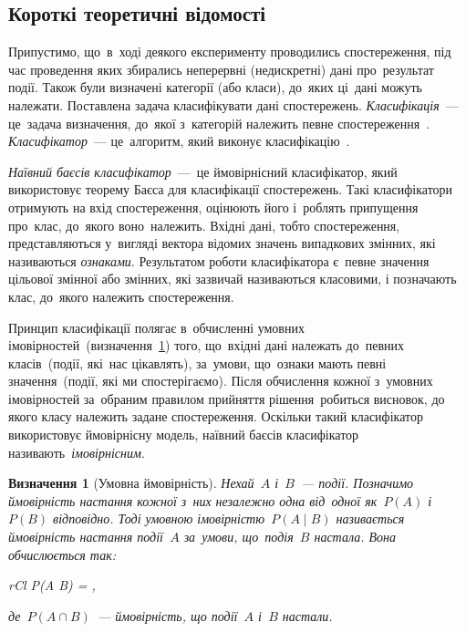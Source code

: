 \documentclass[
	a4paper,
	oneside,
	DIV = 12,
	fontsize = 13pt,
	headings = normal,
	numbers = endperiod,
]{scrartcl}
\theoremstyle{mythm}
\newtheorem{mydef}{Визначення}
\begin{document}
		\subsection{Короткі теоретичні відомості}
			\label{ssec:theory-short}
			Припустимо, що~в~ході деякого експерименту проводились спостереження, під час проведення яких збирались неперервні (недискретні) дані про~результат події. Також були визначені категорії (або класи), до~яких ці~дані можуть належати. Поставлена задача класифікувати дані спостережень. \emph{Класифікація}~— це~задача визначення, до~якої з~категорій належить певне спостереження~\cite{wiki-stat-classification}. \emph{Класифікатор}~— це~алгоритм, який виконує класифікацію~\cite{wiki-stat-classification}.

			\emph{Наївний баєсів класифікатор}~— це ймовірнісний класифікатор, який використовує теорему Баєса для класифікації спостережень. Такі класифікатори отримують на вхід спостереження, оцінюють його і~роблять припущення про~клас, до~якого воно~належить. Вхідні дані, тобто спостереження, представляються у~вигляді вектора відомих значень випадкових змінних, які називаються \emph{ознаками}. Результатом роботи класифікатора є~певне значення цільової змінної або змінних, які зазвичай називаються класовими, і позначають клас, до~якого належить спостереження.

			Принцип класифікації полягає в~обчисленні умовних імовірностей~(визначення~\ref{def:conditional-probability}) того, що~вхідні дані належать до~певних класів~(події, які~нас цікавлять), за~умови, що~ознаки мають певні значення~(події, які ми спостерігаємо). Після обчислення кожної з~умовних імовірностей за~обраним правилом прийняття рішення~робиться висновок, до якого класу належить задане спостереження. Оскільки такий класифікатор використовує ймовірнісну модель, наївний баєсів класифікатор називають~\emph{імовірнісним}.

			\begin{mydef}[Умовна ймовірність]
				\label{def:conditional-probability}
				Нехай~$A$ і~$B$~— події. Позначимо ймовірність настання кожної з~них незалежно одна від~одної як~$P(A)$ і~$P(B)$ відповідно. Тоді \emph{умовною імовірністю}~$P(A \mid B)$ називається ймовірність настання події~$A$ за~умови, що~подія~$B$ настала. Вона обчислюється так:
				\begin{IEEEeqnarray}{rCl}
					P(A \mid B) = ,
				\end{IEEEeqnarray}
				де~$P(A \cap B)$~— ймовірність, що події~$A$ і~$B$ настали. 
			\end{mydef}
			
\end{document}

